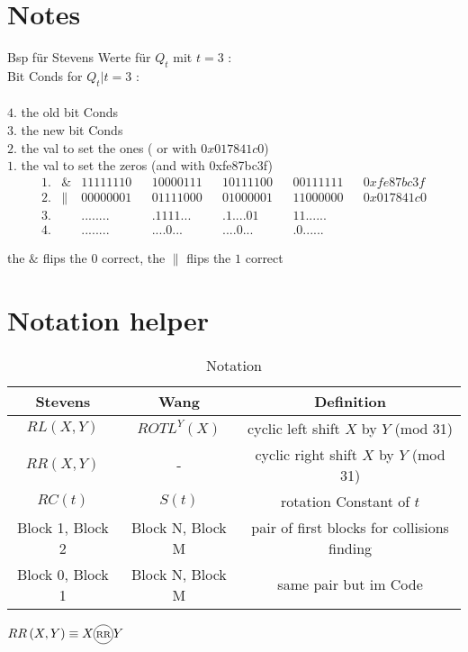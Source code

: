 \section*{Notes}
 
Bsp für Stevens Werte für $Q_t$ mit $t = 3$ :\\
Bit Conds for $Q_t | t =3$ :\\
\\
$4.$ the old bit Conds\\
$3.$ the new bit Conds\\
$2.$ the val to set the ones ( or with $0x017841c0$)\\
$1.$ the val to set the zeros (and with 0xfe87bc3f)\\

\begin{align*}    
    1.& \& & 11111110 & & 10000111 & & 10111100 & & 00111111 & & 0xfe87bc3f \\
    2.& \| & 00000001 & & 01111000 & & 01000001 & & 11000000 & & 0x017841c0 \\
    3.&    & ........ & & .1111... & & .1....01 & & 11...... & &  \\
    4.&    & ........ & & ....0... & & ....0... & & .0...... & &  
\end{align*}

  the $\&$ flips the $0$ correct, the $\|$ flips the $1$ correct



\section{Notation helper}


\begin{table}[]
    \caption*{\large Notation}
    \begin{tabular}{ c | c | c }
    Stevens & Wang  & Definition  \\
    \hline 
    $ RL \left(X , Y \right) $  & $ ROTL^{Y} \left( X\right) $  & cyclic left shift $X$ by $Y$ (mod 31) \\
    $ RR \left(X , Y \right) $  & -                             & cyclic right shift $X$ by $Y$ (mod 31) \\
    $ RC \left(t \right) $      &$ S \left(t \right) $          & rotation Constant of $t$ \\
    Block 1, Block 2 & Block N, Block M & pair of first blocks for collisions finding   \\
    Block 0, Block 1 & Block N, Block M & same pair but im Code\\
    \end{tabular}
    \label{notation}
\end{table}

$RR\left(X,Y\right) \equiv X  \circled{RR} Y$


